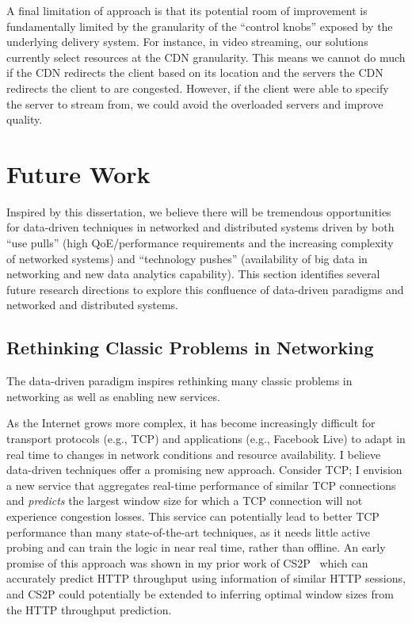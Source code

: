 A final limitation of \ddn approach is that its potential room of
improvement is fundamentally limited by the granularity of the 
``control knobs'' exposed
by  the underlying delivery system. 
For instance, in video streaming, our solutions currently select resources
at the CDN granularity. This means we cannot
do much if the CDN redirects the client based on its location
and the servers the CDN redirects the client to are
congested. However, if the client were able to specify
the server to stream from, we could avoid the overloaded
servers and improve quality.



\section{Future Work}

Inspired by this dissertation, we believe there 
will be tremendous opportunities for 
data-driven techniques in networked and distributed systems 
driven by both ``use pulls'' (high QoE/performance requirements and 
the increasing complexity of networked systems) and ``technology 
pushes'' (availability of big data in networking and new data 
analytics capability).
This section identifies several future research directions
to explore this confluence of data-driven paradigms and 
networked and distributed systems.

\subsection{Rethinking Classic Problems in Networking}

The data-driven paradigm inspires rethinking many classic 
problems in networking as well as enabling new services. 

As the Internet grows more complex, it has become increasingly difficult for transport protocols (e.g., TCP) and applications (e.g., Facebook Live) to adapt in real time to changes in network conditions and resource availability.
I believe data-driven techniques offer a promising new approach. Consider TCP;
I envision a new service that aggregates real-time performance of similar TCP connections and {\em predicts} the largest window size for which a TCP connection will not experience congestion losses.
This service can potentially lead to better TCP performance than many state-of-the-art techniques, as it needs little active probing and can train the logic in near real time, rather than offline. 
An early promise of this approach was shown in my prior work of CS2P~\cite{cs2p} which can accurately predict HTTP throughput using information of similar HTTP sessions, and CS2P could potentially be extended to inferring optimal window sizes from the HTTP throughput prediction.

